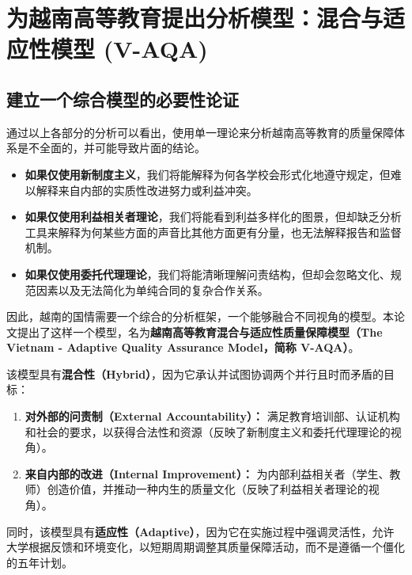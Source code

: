 \section{为越南高等教育提出分析模型：混合与适应性模型 (V-AQA)}
\label{sec:mo_hinh_V-AQA_de_xuat}

\subsection{建立一个综合模型的必要性论证}
\label{subsec:luan_giai_V-AQA}
通过以上各部分的分析可以看出，使用单一理论来分析越南高等教育的质量保障体系是不全面的，并可能导致片面的结论。
\begin{itemize}
    \item \textbf{如果仅使用新制度主义}，我们将能解释为何各学校会形式化地遵守规定，但难以解释来自内部的实质性改进努力或利益冲突。
    \item \textbf{如果仅使用利益相关者理论}，我们将能看到利益多样化的图景，但却缺乏分析工具来解释为何某些方面的声音比其他方面更有分量，也无法解释报告和监督机制。
    \item \textbf{如果仅使用委托代理理论}，我们将能清晰理解问责结构，但却会忽略文化、规范因素以及无法简化为单纯合同的复杂合作关系。
\end{itemize}

因此，越南的国情需要一个综合的分析框架，一个能够融合不同视角的模型。本论文提出了这样一个模型，名为\textbf{越南高等教育混合与适应性质量保障模型（The Vietnam - Adaptive Quality Assurance Model，简称 V-AQA）}。

该模型具有\textbf{混合性（Hybrid）}，因为它承认并试图协调两个并行且时而矛盾的目标：
\begin{enumerate}
    \item \textbf{对外部的问责制（External Accountability）：} 满足教育培训部、认证机构和社会的要求，以获得合法性和资源（反映了新制度主义和委托代理理论的视角）。
    \item \textbf{来自内部的改进（Internal Improvement）：} 为内部利益相关者（学生、教师）创造价值，并推动一种内生的质量文化（反映了利益相关者理论的视角）。
\end{enumerate}

同时，该模型具有\textbf{适应性（Adaptive）}，因为它在实施过程中强调灵活性，允许大学根据反馈和环境变化，以短期周期调整其质量保障活动，而不是遵循一个僵化的五年计划。

